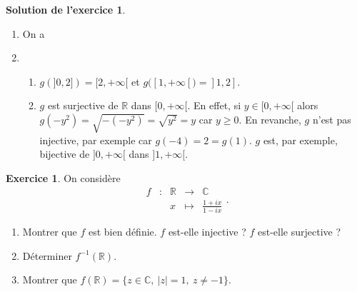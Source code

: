 \documentclass[a4paper, 11pt,openany]{article}%
\theoremstyle{plain}
\theoremstyle{definition}
\newtheorem{exo}{Exercice}
\newtheorem{sol}{Solution de l'exercice}
\theoremstyle{remark}
\newcommand{\R}{\mathbb{R}}
\newcommand{\C}{\mathbb{C}}
\begin{document}
\begin{sol}
\begin{enumerate}
\item On a
\begin{center}
\end{center}
\item 
\begin{enumerate}
\item $g(]0,2]) = [2,+\infty[$ et $g([1,+\infty[)=]1,2]$.
\item $g$ est surjective de $\R$ dans $[0,+\infty[$. En effet, si $y \in [0,+\infty[$ alors $g(-y^2) = \sqrt{-(-y^2)} = \sqrt{y^2} =y$ car $y \geqslant 0$. En revanche, $g$ n'est pas injective, par exemple car $g(-4) = 2 = g(1)$. $g$ est, par exemple, bijective de $]0,+\infty[$ dans $]1,+\infty[$.
\end{enumerate}
\end{enumerate}
\end{sol}



\begin{exo}
On considère
\[ \begin{array}{ccccc}
f & : & \R & \to & \C \\
 & & x & \mapsto & \frac{1+ix}{1-ix}
\end{array} .\]
\begin{enumerate}
 \item Montrer que $f$ est bien définie. $f$ est-elle injective ? $f$ est-elle surjective ?
 \item Déterminer $f^{-1}(\mathbb R)$.
 \item Montrer que $f(\mathbb R)=\{z\in\mathbb C,\ |z|=1,\ z\neq-1\}$.
\end{enumerate}
\end{exo}
\end{document}
